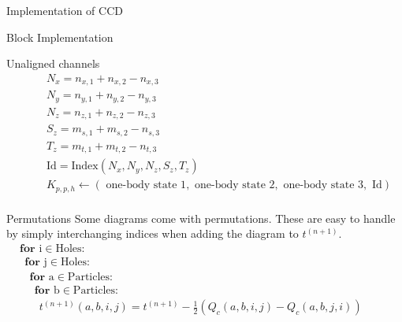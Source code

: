 \documentclass[twoside,english]{uiofysmaster}
\begin{document}
\begin{chapter}{Implementation of CCD}
\begin{section}{Block Implementation}
\begin{subsection}{Unaligned channels}
\begin{align*}
				&\:\:\:\:\:\:\:\: N_x = n_{x,1} + n_{x,2} - n_{x,3}\\
				&\:\:\:\:\:\:\:\: N_y = n_{y,1} + n_{y,2} - n_{y,3}\\
				&\:\:\:\:\:\:\:\: N_z = n_{z,1} + n_{z,2} - n_{z,3}\\
 				&\:\:\:\:\:\:\:\: S_z = m_{s,1} + m_{s,2} - n_{s,3}\\
				&\:\:\:\:\:\:\:\: T_z = m_{t,1} + m_{t,2} - n_{t,3}\\
				&\:\:\:\:\:\:\:\: \text{Id} = \text{Index}(N_x,N_y,N_z,S_z,T_z) \\
				&\:\:\:\:\:\:\:\: K_{p,p,h} \leftarrow (\text{ one-body state 1}, \text{ one-body state 2}, \text{ one-body state 3},  \text{ Id}) \\
			\end{align*}
		\end{subsection}

		\begin{subsection}{Permutations}
			Some diagrams come with permutations. These are easy to handle by simply interchanging indices when adding the diagram to $t^{(n+1)}$. 
			\begin{align*}
				&\mathbf{for } \text{ i} \in \text{Holes}: \\
				&\:\:\mathbf{for } \text{ j} \in \text{Holes}: \\
				&\:\:\:\:\mathbf{for } \text{ a} \in \text{Particles}: \\
				&\:\:\:\:\:\:\mathbf{for } \text{ b} \in \text{Particles}: \\
				&\:\:\:\:\:\:\:\: t^{(n+1)}(a,b,i,j) = t^{(n+1)} - \frac{1}{2}\left(Q_c(a,b,i,j) - Q_c(a,b,j,i)\right) \:\:\:\:\:\:\:\:\:\:\:\:\:\:\:
			\end{align*}
		\end{subsection}

	\end{section}


\end{chapter}
\end{document}

